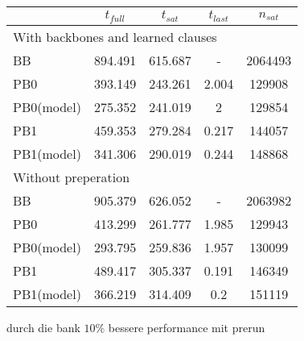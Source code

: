 \begin{table}
\begin{tabular}{l | c c c c}
 & $t_{full}$ & $t_{sat}$ & $t_{last}$& $n_{sat}$\\
\hline
\multicolumn{5}{l}{With backbones and learned clauses}\\
BB & 894.491 & 615.687 & - & 2064493\\
PB0 & 393.149 & 243.261 & 2.004 & 129908\\
PB0(model) & 275.352 & 241.019 & 2 & 129854\\
PB1 & 459.353 & 279.284 & 0.217 & 144057\\
PB1(model) & 341.306 & 290.019 & 0.244 & 148868\\
\hline 
\multicolumn{3}{l}{Without preperation}\\
BB & 905.379 & 626.052 & - & 2063982\\
PB0 & 413.299 & 261.777 & 1.985 & 129943\\
PB0(model) & 293.795 & 259.836 & 1.957 & 130099\\
PB1 & 489.417 & 305.337 & 0.191 & 146349\\
PB1(model) & 366.219 & 314.409 & 0.2 & 151119\\
\hline
\end{tabular}
\end{table}

durch die bank $10\%$ bessere performance mit prerun